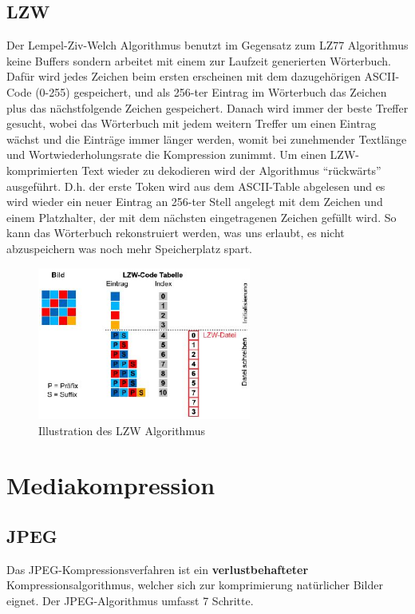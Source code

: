 \documentclass{article}
\begin{document}
\subsection{LZW}
Der Lempel-Ziv-Welch Algorithmus benutzt im Gegensatz zum LZ77 Algorithmus keine Buffers sondern arbeitet mit einem zur Laufzeit generierten Wörterbuch. Dafür wird jedes Zeichen beim ersten erscheinen mit dem dazugehörigen ASCII-Code (0-255) gespeichert, und als 256-ter Eintrag im Wörterbuch das Zeichen plus das nächstfolgende Zeichen gespeichert. Danach wird immer der beste Treffer gesucht, wobei das Wörterbuch mit jedem weitern Treffer um einen Eintrag wächst und die Einträge immer länger werden, womit bei zunehmender Textlänge und Wortwiederholungsrate die Kompression zunimmt. Um einen LZW-komprimierten Text wieder zu dekodieren wird der Algorithmus ``rückwärts'' ausgeführt. D.h. der erste Token wird aus dem ASCII-Table abgelesen und es wird wieder ein neuer Eintrag an 256-ter Stell angelegt mit dem Zeichen und einem Platzhalter, der mit dem nächsten eingetragenen Zeichen gefüllt wird. So kann das Wörterbuch rekonstruiert werden, was uns erlaubt, es nicht abzuspeichern was noch mehr Speicherplatz spart.
\begin{figure}[h]
		\begin{center}
		\includegraphics[width=7cm]{img/lzw.png}
		\end{center}
		\caption{Illustration des LZW Algorithmus}
		\label{fig:Illustration des LZW Algorithmus}
\end{figure}
\section{Mediakompression}
\subsection{JPEG}
Das JPEG-Kompressionsverfahren ist ein \textbf{verlustbehafteter} Kompressionsalgorithmus, welcher sich zur komprimierung natürlicher Bilder eignet. Der JPEG-Algorithmus umfasst 7 Schritte.
\end{document}
